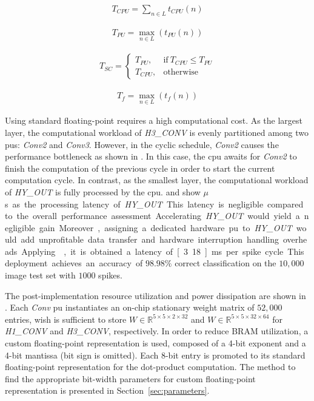 \begin{eqnarray} \label{eq:time_cpu}
T_{CPU} = \sum_{n\in L} t_{CPU}(n)
\end{eqnarray}

\begin{eqnarray} \label{eq:time_pu}
T_{PU} = \max_{n\in L}(t_{PU}(n))
\end{eqnarray}

\begin{eqnarray} \label{eq:time_spike}
T_{SC} =
\begin{cases}
T_{PU}, & \text{if}\ T_{CPU}\le T_{PU} \\
T_{CPU}, & \text{otherwise}
\end{cases}
\end{eqnarray}

\begin{eqnarray} \label{eq:time_finish}
T_{f} = \max_{n\in L}(t_{f}(n))
\end{eqnarray}

Using standard floating-point requires a high computational cost. As the largest layer, the computational workload of \emph{H3\_CONV} is evenly partitioned among two \glspl{pu}: \emph{Conv2} and \emph{Conv3}. However, in the cyclic schedule, \emph{Conv2} causes the performance bottleneck as shown in . In this case, the \gls{cpu} awaits for \emph{Conv2} to finish the computation of the previous cycle in order to start the current computation cycle. In contrast, as the smallest layer, the computational workload of \emph{HY\_OUT} is fully processed by the \gls{cpu}.  and  show \unit[4]{$\mu$s} as the processing latency of \emph{HY\_OUT}. This latency is negligible compared to the overall performance assessment. Accelerating \emph{HY\_OUT} would yield a negligible gain. Moreover, assigning a dedicated hardware \gls{pu} to \emph{HY\_OUT} would add unprofitable data transfer and hardware interruption handling overheads.

Applying , it is obtained a latency of \unit[3.18]{ms} per spike cycle. This deployment achieves an accuracy of $98.98\%$ correct classification on the $10,000$ image test set with $1000$ spikes.

The post-implementation resource utilization and power dissipation are shown in . Each \emph{Conv} \gls{pu} instantiates an on-chip stationary weight matrix of $52,000$ entries, wish is sufficient to store $W\in\mathbb{R}^{5\times 5\times 2\times 32}$ and $W\in\mathbb{R}^{5\times 5\times 32\times 64}$ for \emph{H1\_CONV} and \emph{H3\_CONV}, respectively. In order to reduce BRAM utilization, a custom floating-point representation is used, composed of a 4-bit exponent and a 4-bit mantissa (bit sign is omitted). Each 8-bit entry is promoted to its standard floating-point representation for the dot-product computation. The method to find the appropriate bit-width parameters for custom floating-point representation is presented in Section~\ref{sec:parameters}.

